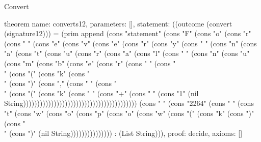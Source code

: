 \begin{lexlean}{Convert}
\begin{semanticmodule}
theorem{
  name: converts12,
  parameters: [],
  statement: ((outcome (convert (signature12))) = (prim append (cons "statement" (cons "F" (cons "o" (cons "r" (cons " " (cons "e" (cons "v" (cons "e" (cons "r" (cons "y" (cons " " (cons "n" (cons "a" (cons "t" (cons "u" (cons "r" (cons "a" (cons "l" (cons " " (cons "n" (cons "u" (cons "m" (cons "b" (cons "e" (cons "r" (cons " " (cons "\\" (cons "(" (cons "k" (cons "\\" (cons ")" (cons "," (cons " " (cons "\\" (cons "(" (cons "k" (cons " " (cons "+" (cons " " (cons "1" (nil String))))))))))))))))))))))))))))))))))))))))) (cons " " (cons "\u2264" (cons " " (cons "t" (cons "w" (cons "o" (cons "p" (cons "o" (cons "w" (cons "(" (cons "k" (cons ")" (cons "\\" (cons ")" (nil String))))))))))))))) : (List String))),
  proof: decide{},
  axioms: []
}


\end{semanticmodule}
\end{lexlean}
